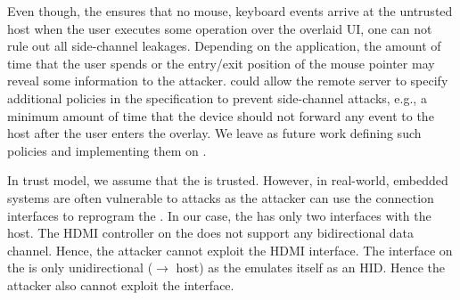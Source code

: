  Even though, the \device ensures that no mouse, keyboard events arrive at the untrusted host when the user executes some operation over the overlaid UI, one can not rule out all side-channel leakages. Depending on the application, the amount of time that the user spends or the entry/exit position of the mouse pointer may reveal some information to the attacker. 
\device could allow the remote server to specify additional policies in the specification to prevent side-channel attacks, e.g., a minimum amount of time that the device should not forward any event to the host after the user enters the overlay. We leave as future work defining such policies and implementing them on \name.


 In \name trust model, we assume that the \device is trusted. However, in real-world, embedded systems are often vulnerable to attacks as the attacker can use the connection interfaces to reprogram the \device. In our case, the \device has only two interfaces with the host. The HDMI controller on the \device does not support any bidirectional data channel. Hence, the attacker cannot exploit the HDMI interface. The \usb interface on the \device is only unidirectional (\device $\rightarrow$ host) as the \device emulates itself as an HID. Hence the attacker also cannot exploit the \usb interface.  
